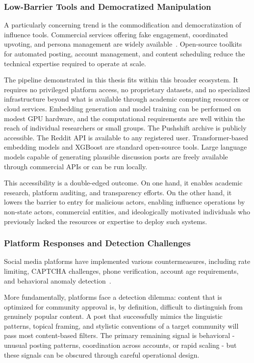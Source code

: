 \subsubsection*{Low-Barrier Tools and Democratized Manipulation}

A particularly concerning trend is the commodification and democratization of influence tools. Commercial services offering fake engagement, coordinated upvoting, and persona management are widely available~\cite{thomas2013trafficking}. Open-source toolkits for automated posting, account management, and content scheduling reduce the technical expertise required to operate at scale.

The pipeline demonstrated in this thesis fits within this broader ecosystem. It requires no privileged platform access, no proprietary datasets, and no specialized infrastructure beyond what is available through academic computing resources or cloud services. Embedding generation and model training can be performed on modest GPU hardware, and the computational requirements are well within the reach of individual researchers or small groups. The Pushshift archive is publicly accessible. The Reddit API is available to any registered user. Transformer-based embedding models and XGBoost are standard open-source tools. Large language models capable of generating plausible discussion posts are freely available through commercial APIs or can be run locally.

This accessibility is a double-edged outcome. On one hand, it enables academic research, platform auditing, and transparency efforts. On the other hand, it lowers the barrier to entry for malicious actors, enabling influence operations by non-state actors, commercial entities, and ideologically motivated individuals who previously lacked the resources or expertise to deploy such systems.

\subsubsection*{Platform Responses and Detection Challenges}

Social media platforms have implemented various countermeasures, including 
rate limiting, CAPTCHA challenges, phone verification, account age 
requirements, and behavioral anomaly detection~\cite{jhaver2019does}.

More fundamentally, platforms face a detection dilemma: content that is optimized for community approval is, by definition, difficult to distinguish from genuinely popular content. A post that successfully mimics the linguistic patterns, topical framing, and stylistic conventions of a target community will pass most content-based filters. The primary remaining signal is behavioral - unusual posting patterns, coordination across accounts, or rapid scaling - but these signals can be obscured through careful operational design.


